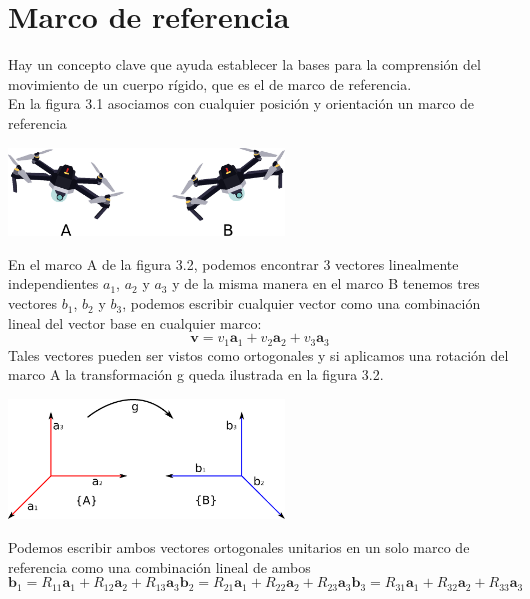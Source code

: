 \section{Marco de referencia}
Hay un concepto clave que ayuda establecer la bases para la comprensión del movimiento de
un cuerpo rígido, que es el de marco de referencia.\\
En la figura 3.1 asociamos con cualquier posición y orientación un marco de referencia
\begin{center}
	\includegraphics[width=0.55\textwidth]{Contenido/Cuerpo/Capitulo3/Fig10.eps}
	\label{fig:ModeloMat:Fig1}
\end{center}
En el marco A de la figura 3.2, podemos encontrar 3 vectores linealmente independientes $a_1$, $a_2$ y $a_3$
y de la misma manera en el marco B tenemos tres vectores $b_1$, $b_2$ y $b_3$, podemos
escribir cualquier vector como una combinación lineal del vector base en cualquier marco:
\begin{equation}
	\textbf{v} = v_1 \textbf{a}_1 + v_2 \textbf{a}_2 + v_3 \textbf{a}_3
\end{equation}
Tales vectores pueden ser vistos como ortogonales y si aplicamos una rotación del marco A
la transformación g queda ilustrada en la figura 3.2.
\begin{center}
	\includegraphics[width=0.55\textwidth]{Contenido/Cuerpo/Capitulo3/Fig11.eps}
	\label{fig:ModeloMat:Fig1}
\end{center}
Podemos escribir ambos vectores ortogonales unitarios en un solo marco de referencia como
una combinación lineal de ambos
\begin{subequations}
	\begin{equation}
		\textbf{b}_1 = R_{11}\textbf{a}_1 + R_{12}\textbf{a}_2 + R_{13}\textbf{a}_3
	\end{equation}
	\begin{equation}
		\textbf{b}_2 = R_{21}\textbf{a}_1 + R_{22}\textbf{a}_2 + R_{23}\textbf{a}_3
	\end{equation}
	\begin{equation}
		\textbf{b}_3 = R_{31}\textbf{a}_1 + R_{32}\textbf{a}_2 + R_{33}\textbf{a}_3
	\end{equation}
\end{subequations}

